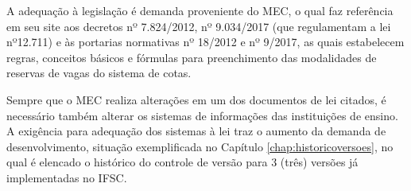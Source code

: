  A adequação à legislação é demanda proveniente do \gls{MEC}, o qual faz referência em seu site aos decretos nº 7.824/2012, nº 9.034/2017 (que regulamentam a lei nº12.711) e às portarias normativas nº 18/2012 e nº 9/2017, as quais estabelecem regras, conceitos básicos e fórmulas para preenchimento das modalidades de reservas de vagas do sistema de cotas. 
 
 Sempre que o \gls{MEC} realiza alterações em um dos documentos de lei citados, é necessário também alterar os sistemas de informações das instituições de ensino. A exigência para adequação dos sistemas à lei traz o aumento da demanda de desenvolvimento, situação exemplificada no Capítulo  \ref{chap:historicoversoes}, no qual é elencado o histórico do controle de versão para 3 (três) versões já implementadas no \gls{IFSC}.
 
 

 
 
